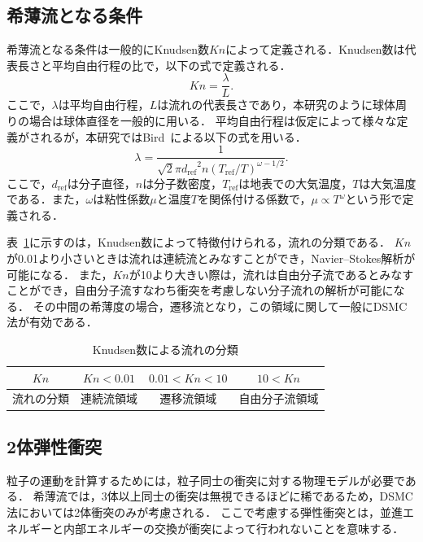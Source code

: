 \subsection{希薄流となる条件}
希薄流となる条件は一般的にKnudsen数$Kn$によって定義される．Knudsen数は代表長さと平均自由行程の比で，以下の式で定義される．
\begin{equation}
    Kn = \dfrac{\lambda}{L}.
\end{equation}
ここで，$\lambda$は平均自由行程，$L$は流れの代表長さであり，本研究のように球体周りの場合は球体直径を一般的に用いる．
平均自由行程は仮定によって様々な定義がされるが，本研究ではBird~\cite{bird1994molecular}による以下の式を用いる．
\begin{equation}
    \lambda = \dfrac{1}{\sqrt{2}\pi {d_\mathrm{ref}}^2n\left(T_\mathrm{ref}/T\right)^{\omega - 1/2}}.
\end{equation}
ここで，$d_\mathrm{ref}$は分子直径，$n$は分子数密度，$T_\mathrm{ref}$は地表での大気温度，$T$は大気温度である．また，$\omega$は粘性係数$\mu$と温度$T$を関係付ける係数で，$\mu \propto T^\omega$という形で定義される．

表~\ref{tab:kn-category}に示すのは，Knudsen数によって特徴付けられる，流れの分類である．
$Kn$が0.01より小さいときは流れは連続流とみなすことができ，Navier–Stokes解析が可能になる．
また，$Kn$が10より大きい際は，流れは自由分子流であるとみなすことができ，自由分子流すなわち衝突を考慮しない分子流れの解析が可能になる．
その中間の希薄度の場合，遷移流となり，この領域に関して一般にDSMC法が有効である．
\begin{table}[H]
    \centering
    \caption{Knudsen数による流れの分類}
    \begin{tabular}{c|ccc}
        \hline\hline
        $Kn$ & $Kn < 0.01$ & $0.01 < Kn < 10$ & $ 10 < Kn $ \\ \hline
        流れの分類 & 連続流領域 & 遷移流領域 & 自由分子流領域 \\
        \hline\hline
    \end{tabular}
    \label{tab:kn-category}
\end{table}

\subsection{2体弾性衝突}
粒子の運動を計算するためには，粒子同士の衝突に対する物理モデルが必要である．
希薄流では，3体以上同士の衝突は無視できるほどに稀であるため，DSMC法においては2体衝突のみが考慮される．
ここで考慮する弾性衝突とは，並進エネルギーと内部エネルギーの交換が衝突によって行われないことを意味する．


